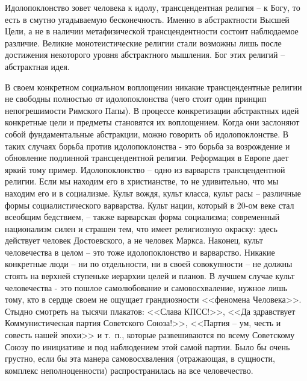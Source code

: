 \documentclass{book}
\begin{document}
Идолопоклонство зовет человека к идолу, трансцендентная религия -- к Богу, то есть в смутно угадываемую бесконечность. Именно в абстрактности Высшей Цели, а не в наличии мета­физической трансцендентности состоит наблюдаемое разли­чие. Великие монотеистические религии стали возможны лишь после достижения некоторого уровня абстрактного мышления. Бог этих религий -- абстрактная идея.

В своем конкретном социальном воплощении никакие транс­цендентные религии не свободны полностью от идолопоклонст­ва (чего стоит один принцип непогрешимости Римского Папы). В процессе конкретизации абстрактных идей конкретные цели и предметы становятся их воплощением. Когда они засло­няют собой фундаментальные абстракции, можно говорить об идолопоклонстве. В таких случаях борьба против идоло­поклонства - это борьба за возрождение и обновление подлин­ной трансцендентной религии. Реформация в Европе дает яркий тому пример. Идолопоклонство -- одно из варварств трансцен­дентной религии. Если мы находим его в христианстве, то не удивительно, что мы находим его и в социализме. Культ вождя, культ класса, культ расы -- различные формы социалистиче­ского варварства. Культ нации, который в 20-ом веке стал всеоб­щим бедствием, -- также варварская форма социализма; совре­менный национализм силен и страшен тем, что имеет религиоз­ную окраску: здесь действует человек Достоевского, а не чело­век Маркса. Наконец, культ 
человечества в целом -- это тоже идолопоклонство и варварство. Никакие конкретные люди -- ни по отдельности, ни в своей совокупности -- не должны стоять на верхней ступеньке иерархии целей и планов. В лучшем слу­чае культ человечества - это пошлое самолюбование и само­восхваление, нужное лишь тому, кто в сердце своем не ощуща­ет грандиозности <<феномена Человека>>. Стыдно смотреть на тысячи плакатов: <<Слава КПСС!>>, <<Да здравствует Коммуни­стическая партия Советского Союза!>>, <<Партия -- ум, честь и совесть нашей эпохи>> и т.~п., которые развешиваются по всему Советскому Союзу по инициативе и под наблюдением этой са­мой партии. Было бы очень грустно, если бы эта манера само­восхваления (отражающая, в сущности, комплекс неполноцен­ности) распространилась на все человечество.
\end{document}
